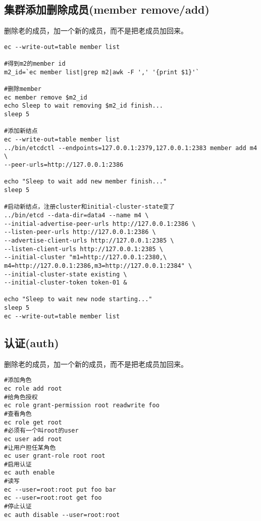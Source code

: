 \subsection{集群添加删除成员(member remove/add)}
删除老的成员，加一个新的成员，而不是把老成员加回来。
\begin{verbatim}
ec --write-out=table member list

#得到m2的member id
m2_id=`ec member list|grep m2|awk -F ',' '{print $1}'`

#删除member
ec member remove $m2_id
echo Sleep to wait removing $m2_id finish...
sleep 5

#添加新结点
ec --write-out=table member list
../bin/etcdctl --endpoints=127.0.0.1:2379,127.0.0.1:2383 member add m4 \
--peer-urls=http://127.0.0.1:2386 

echo "Sleep to wait add new member finish..."
sleep 5

#启动新结点，注册cluster和initial-cluster-state变了
../bin/etcd --data-dir=data4 --name m4 \
--initial-advertise-peer-urls http://127.0.0.1:2386 \
--listen-peer-urls http://127.0.0.1:2386 \
--advertise-client-urls http://127.0.0.1:2385 \
--listen-client-urls http://127.0.0.1:2385 \
--initial-cluster "m1=http://127.0.0.1:2380,\
m4=http://127.0.0.1:2386,m3=http://127.0.0.1:2384" \
--initial-cluster-state existing \
--initial-cluster-token token-01 &

echo "Sleep to wait new node starting..."
sleep 5
ec --write-out=table member list
\end{verbatim}

\subsection{认证(auth)}
删除老的成员，加一个新的成员，而不是把老成员加回来。
\begin{verbatim}
#添加角色
ec role add root
#给角色授权
ec role grant-permission root readwrite foo
#查看角色
ec role get root
#必须有一个叫root的user
ec user add root
#让用户担任某角色
ec user grant-role root root
#启用认证
ec auth enable
#读写
ec --user=root:root put foo bar
ec --user=root:root get foo
#停止认证
ec auth disable --user=root:root
\end{verbatim}
